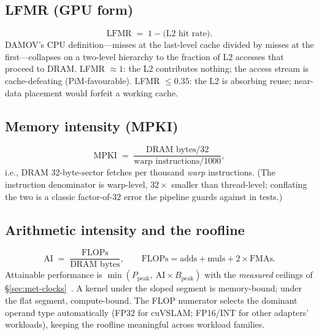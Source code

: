 \subsection{LFMR (GPU form)}
\begin{equation}
\text{LFMR} \;=\; 1 - \text{(L2 hit rate)}.
\label{eq:lfmr}
\end{equation}
DAMOV's CPU definition---misses at the last-level cache divided by misses at
the first---collapses on a two-level hierarchy to the fraction of L2
accesses that proceed to DRAM. LFMR $\approx 1$: the L2 contributes nothing;
the access stream is cache-defeating (PiM-favourable). LFMR $\leq 0.35$:
the L2 is absorbing reuse; near-data placement would forfeit a working
cache.

\subsection{Memory intensity (MPKI)}
\begin{equation}
\text{MPKI} \;=\; \frac{\text{DRAM bytes}/32}
{\text{warp instructions}/1000},
\label{eq:mpki}
\end{equation}
i.e., DRAM 32-byte-sector fetches per thousand \emph{warp} instructions.
(The instruction denominator is warp-level, $32\times$ smaller than
thread-level; conflating the two is a classic factor-of-32 error the
pipeline guards against in tests.)

\subsection{Arithmetic intensity and the roofline}
\label{sec:met-roofline}
\begin{equation}
\text{AI} \;=\; \frac{\text{FLOPs}}{\text{DRAM bytes}},\qquad
\text{FLOPs} = \text{adds} + \text{muls} + 2\times\text{FMAs}.
\label{eq:ai}
\end{equation}
Attainable performance is $\min(P_{\text{peak}},\ \text{AI}\times
B_{\text{peak}})$ with the \emph{measured} ceilings of
\S\ref{sec:met-clocks}~\cite{williams2009roofline}. A kernel under the
sloped segment is memory-bound; under the flat segment, compute-bound. The
FLOP numerator selects the dominant operand type automatically (FP32 for
cuVSLAM; FP16/INT for other adapters' workloads), keeping the roofline
meaningful across workload families.


